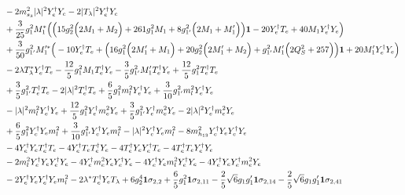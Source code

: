 {\begin{align}
 &-2 m_{s_3}^2 |\lambda|^2 {Y_{e}^{\dagger}  Y_e} -2 |T_{\lambda}|^2 {Y_{e}^{\dagger}  Y_e} \nonumber \\ 
 &+\frac{3}{25} g_{1}^{2} M_1^* \Big(\Big(15 g_{2}^{2} \Big(2 M_1  + M_2\Big) + 261 g_{1}^{2} M_1  + 8 g_{1'}^{2} \Big(2 M_1  + M_1'\Big)\Big){\bf 1}  -20 {Y_{e}^{\dagger}  T_e}  + 40 M_1 {Y_{e}^{\dagger}  Y_e} \Big)\nonumber \\ 
 &+\frac{3}{50} g_{1'}^{2} M_1'^* \Big(-10 {Y_{e}^{\dagger}  T_e}  + \Big(16 g_{1}^{2} \Big(2 M_1'  + M_1\Big) + 20 g_{2}^{2} \Big(2 M_1'  + M_2\Big) + g_{1'}^{2} M_1' \Big(2 Q_{S}^{2}  + 257\Big)\Big){\bf 1}  + 20 M_1' {Y_{e}^{\dagger}  Y_e} \Big)\nonumber \\ 
 &-2 \lambda T_{\lambda}^* {Y_{e}^{\dagger}  T_e} -\frac{12}{5} g_{1}^{2} M_1 {T_{e}^{\dagger}  Y_e} -\frac{3}{5} g_{1'}^{2} M_1' {T_{e}^{\dagger}  Y_e} +\frac{12}{5} g_{1}^{2} {T_{e}^{\dagger}  T_e} \nonumber \\ 
 &+\frac{3}{5} g_{1'}^{2} {T_{e}^{\dagger}  T_e} -2 |\lambda|^2 {T_{e}^{\dagger}  T_e} +\frac{6}{5} g_{1}^{2} {m_l^2  Y_{e}^{\dagger}  Y_e} +\frac{3}{10} g_{1'}^{2} {m_l^2  Y_{e}^{\dagger}  Y_e} \nonumber \\ 
 &- |\lambda|^2 {m_l^2  Y_{e}^{\dagger}  Y_e} +\frac{12}{5} g_{1}^{2} {Y_{e}^{\dagger}  m_e^2  Y_e} +\frac{3}{5} g_{1'}^{2} {Y_{e}^{\dagger}  m_e^2  Y_e} -2 |\lambda|^2 {Y_{e}^{\dagger}  m_e^2  Y_e} \nonumber \\ 
 &+\frac{6}{5} g_{1}^{2} {Y_{e}^{\dagger}  Y_e  m_l^2} +\frac{3}{10} g_{1'}^{2} {Y_{e}^{\dagger}  Y_e  m_l^2} - |\lambda|^2 {Y_{e}^{\dagger}  Y_e  m_l^2} -8 m_{h_{13}}^2 {Y_{e}^{\dagger}  Y_e  Y_{e}^{\dagger}  Y_e} \nonumber \\ 
 &-4 {Y_{e}^{\dagger}  Y_e  T_{e}^{\dagger}  T_e} -4 {Y_{e}^{\dagger}  T_e  T_{e}^{\dagger}  Y_e} -4 {T_{e}^{\dagger}  Y_e  Y_{e}^{\dagger}  T_e} -4 {T_{e}^{\dagger}  T_e  Y_{e}^{\dagger}  Y_e} \nonumber \\ 
 &-2 {m_l^2  Y_{e}^{\dagger}  Y_e  Y_{e}^{\dagger}  Y_e} -4 {Y_{e}^{\dagger}  m_e^2  Y_e  Y_{e}^{\dagger}  Y_e} -4 {Y_{e}^{\dagger}  Y_e  m_l^2  Y_{e}^{\dagger}  Y_e} -4 {Y_{e}^{\dagger}  Y_e  Y_{e}^{\dagger}  m_e^2  Y_e} \nonumber \\ 
 &-2 {Y_{e}^{\dagger}  Y_e  Y_{e}^{\dagger}  Y_e  m_l^2} -2 \lambda^* {T_{e}^{\dagger}  Y_e} T_{\lambda} +6 g_{2}^{4} {\bf 1} \sigma_{2,2} +\frac{6}{5} g_{1}^{2} {\bf 1} \sigma_{2,11} -\frac{2}{5} \sqrt{6} g_1 g_1' {\bf 1} \sigma_{2,14} -\frac{2}{5} \sqrt{6} g_1 g_1' {\bf 1} \sigma_{2,41} \nonumber \\ 

\end{align}}
